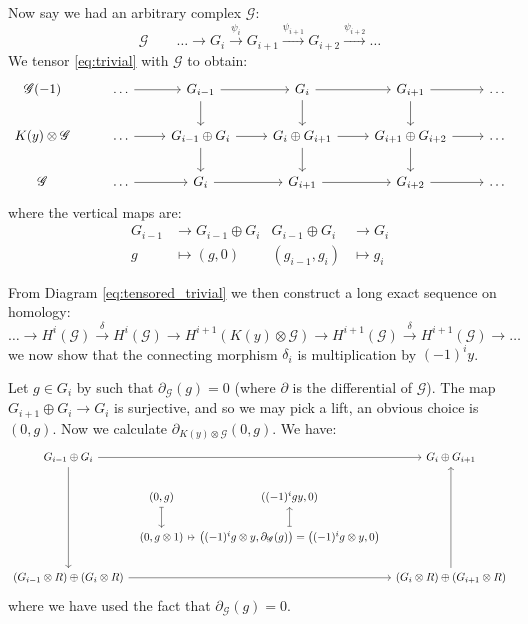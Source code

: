 \documentclass[12pt]{article}
\theoremstyle{plain}
\theoremstyle{definition}
\newcommand{\scr}[1]{\mathscr{#1}}
\newcommand{\lto}{\longrightarrow}
\begin{document}
Now say we had an arbitrary complex $\scr{G}$:
\begin{equation}
\scr{G}\qquad \hdots \lto G_i \stackrel{\psi_i}{\lto} G_{i+1} \stackrel{\psi_{i+1}}{\lto} G_{i+2} \stackrel{\psi_{i+2}}{\lto} \hdots
\end{equation}
We tensor \eqref{eq:trivial} with $\scr{G}$ to obtain:
\begin{equation}\label{eq:tensored_trivial}
\begin{tikzcd}
\scr{G}(-1) & \hdots\arrow[r] & G_{i-1}\arrow[r]\arrow[d] & G_{i}\arrow[r]\arrow[d] & G_{i+1}\arrow[r]\arrow[d] & \hdots\\
K(y) \otimes \scr{G} & \hdots\arrow[r] & G_{i-1} \oplus G_i\arrow[r]\arrow[d] & G_{i} \oplus G_{i+1}\arrow[r]\arrow[d] & G_{i+1} \oplus G_{i+2}\arrow[r]\arrow[d] & \hdots\\
\scr{G} & \hdots\arrow[r] & G_{i}\arrow[r] & G_{i+1}\arrow[r] & G_{i+2}\arrow[r] & \hdots
\end{tikzcd}
\end{equation}
where the vertical maps are:
\begin{align*}
G_{i-1} &\lto G_{i-1} \oplus G_i & G_{i-1} \oplus G_i &\lto G_{i}\\
g &\longmapsto (g,0) & (g_{i-1},g_i) &\longmapsto g_i
\end{align*}





From Diagram \eqref{eq:tensored_trivial} we then construct a long exact sequence on homology:
\begin{equation}
\hdots \lto H^i(\scr{G}) \stackrel{\delta}{\lto} H^i(\scr{G}) \lto H^{i+1}(K(y) \otimes \scr{G}) \lto H^{i+1}(\scr{G}) \stackrel{\delta}{\lto} H^{i+1}(\scr{G}) \lto \hdots
\end{equation}
we now show that the connecting morphism $\delta_i$ is multiplication by $(-1)^i y$.

Let $g \in G_{i}$ by such that $\partial_{\scr{G}}(g) = 0$ (where $\partial$ is the differential of $\scr{G}$). The map $G_{i+1} \oplus G_i \lto G_i$ is surjective, and so we may pick a lift, an obvious choice is $(0,g)$. Now we calculate $\partial_{K(y) \otimes \scr{G}}(0,g)$. We have:
\begin{equation}
\begin{tikzcd}[column sep = tiny]
G_{i-1} \oplus G_i\arrow[rrr]\arrow[ddd] & & & G_i \oplus G_{i+1}\\
& (0,g)\arrow[d,mapsto] & ((-1)^{i}g y,0)\\
& (0, g \otimes 1)\arrow[r,mapsto] & \big((-1)^{i}g \otimes y,\partial_{\scr{G}}(g)\big) = \big((-1)^{i}g \otimes y,0\big)\arrow[u,mapsto]\\
(G_{i-1} \otimes R) \oplus (G_i \otimes R)\arrow[rrr]  & & & (G_i \otimes R) \oplus (G_{i+1} \otimes R)\arrow[uuu]
\end{tikzcd}
\end{equation}
where we have used the fact that $\partial_{\scr{G}}(g) = 0$.
\end{document}
